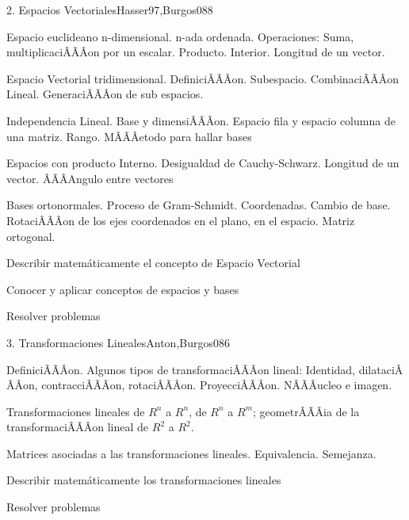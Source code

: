 \begin{sumilla}
\begin{unit}{2. Espacios Vectoriales}{Hasser97,Burgos08}{8}
\begin{topicos}
	\item Espacio euclideano n-dimensional. n-ada ordenada. Operaciones: Suma, multiplicaci\ÃÂÃÂon por un escalar. Producto. Interior. Longitud de un vector.
	\item Espacio Vectorial tridimensional. Definici\ÃÂÃÂon. Subespacio. Combinaci\ÃÂÃÂon Lineal. Generaci\ÃÂÃÂon de sub espacios.
      \item Independencia Lineal. Base y dimensi\ÃÂÃÂon. Espacio fila y espacio columna de una matriz. Rango. M\ÃÂÃÂetodo para hallar bases
      \item Espacios con producto Interno. Desigualdad de Cauchy-Schwarz. Longitud de un vector. \ÃÂÃÂAngulo entre vectores
      \item Bases ortonormales. Proceso de Gram-Schmidt. Coordenadas. Cambio de base. Rotaci\ÃÂÃÂon de los ejes coordenados en el plano, en el espacio. Matriz ortogonal.
    \end{topicos}
   \begin{objetivos}
      \item Describir matem\'aticamente el concepto de Espacio Vectorial
      \item Conocer y aplicar conceptos de espacios y bases
	\item Resolver problemas
   \end{objetivos}
\end{unit}

\begin{unit}{3. Transformaciones Lineales}{Anton,Burgos08}{6}
\begin{topicos}
      \item Definici\ÃÂÃÂon. Algunos tipos de transformaci\ÃÂÃÂon lineal: Identidad, dilataci\ÃÂÃÂon, contracci\ÃÂÃÂon, rotaci\ÃÂÃÂon. Proyecci\ÃÂÃÂon. N\ÃÂÃÂucleo e imagen.
      \item Transformaciones lineales de $R^n$ a $R^n$, de $R^n$ a $R^m$; geometr\ÃÂÃÂia de la transformaci\ÃÂÃÂon lineal de $R^2$ a $R^2$.
      \item Matrices asociadas a las transformaciones lineales. Equivalencia. Semejanza.
\end{topicos}

   \begin{objetivos}
      \item Describir matem\'aticamente los transformaciones lineales
	\item Resolver problemas
   \end{objetivos}
\end{unit}


\end{sumilla}
